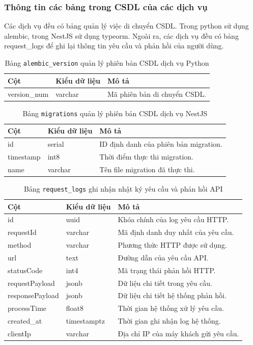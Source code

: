 \subsubsection{Thông tin các bảng trong CSDL của các dịch vụ}

Các dịch vụ đều có bảng quản lý việc di chuyển CSDL.
Trong python sử dụng alembic,
trong NestJS sử dụng typeorm.
Ngoài ra,
các dịch vụ đều có bảng
request\_logs
để ghi lại thông tin yêu cầu và phản hồi
của người dùng.

\begin{table}[H]
\centering
\begin{tabular}{|l|l|p{6cm}|}
\hline
\textbf{Cột} & \textbf{Kiểu dữ liệu} & \textbf{Mô tả} \\ \hline
version\_num & varchar & Mã phiên bản di chuyển CSDL. \\ \hline
\end{tabular}
\caption{Bảng \texttt{alembic\_version} quản lý phiên bản CSDL dịch vụ Python}
\end{table}

\begin{table}[H]
\centering
\begin{tabular}{|l|l|p{6cm}|}
\hline
\textbf{Cột} & \textbf{Kiểu dữ liệu} & \textbf{Mô tả} \\ \hline
id & serial & ID định danh của phiên bản migration. \\ \hline
timestamp & int8 & Thời điểm thực thi migration. \\ \hline
name & varchar & Tên file migration đã thực thi. \\ \hline
\end{tabular}
\caption{Bảng \texttt{migrations} quản lý phiên bản CSDL dịch vụ NestJS}
\end{table}

\begin{table}[H]
\centering
\begin{tabular}{|l|l|p{6cm}|}
\hline
\textbf{Cột} & \textbf{Kiểu dữ liệu} & \textbf{Mô tả} \\ \hline
id & uuid & Khóa chính của log yêu cầu HTTP. \\ \hline
requestId & varchar & Mã định danh duy nhất của yêu cầu. \\ \hline
method & varchar & Phương thức HTTP được sử dụng. \\ \hline
url & text & Đường dẫn của yêu cầu API. \\ \hline
statusCode & int4 & Mã trạng thái phản hồi HTTP. \\ \hline
requestPayload & jsonb & Dữ liệu chi tiết trong yêu cầu. \\ \hline
responsePayload & jsonb & Dữ liệu chi tiết hệ thống phản hồi. \\ \hline
processTime & float8 & Thời gian hệ thống xử lý yêu cầu. \\ \hline
created\_at & timestamptz & Thời gian ghi nhận log hệ thống. \\ \hline
clientIp & varchar & Địa chỉ IP của máy khách gửi yêu cầu. \\ \hline
\end{tabular}
\caption{Bảng \texttt{request\_logs} ghi nhận nhật ký yêu cầu và phản hồi API}
\end{table}








